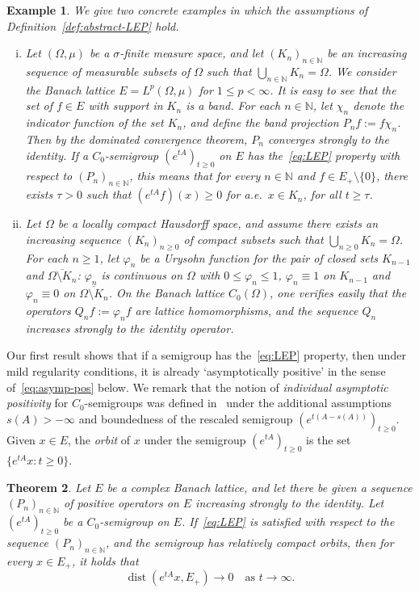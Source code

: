 \documentclass[sn-mathphys]{sn-jnl}%
\theoremstyle{thmstyleone}
\newtheorem{theorem}{Theorem}[section]
\theoremstyle{thmstylethree}
\newtheorem{example}[theorem]{Example}
\DeclareMathOperator{\dist}{dist}
\newcommand{\NN}{\mathbb{N}}
\begin{document}
\begin{example}
	\label{ex:abstract-LEP}
	We give two concrete examples in which the assumptions of Definition~\ref{def:abstract-LEP} hold.
	\begin{enumerate}[(i)]
		\item Let $(\Omega,\mu)$ be a $\sigma$-finite measure space, and let $(K_n)_{n\in\NN}$ be an increasing sequence of measurable subsets of $\Omega$ such that $\bigcup_{n\in\NN}K_n = \Omega$. We consider the Banach lattice $E=L^p(\Omega,\mu)$ for $1\le p<\infty$. It is easy to see that the set of $f\in E$ with support in $K_n$ is a band. For each $n\in\NN$, let $\chi_n$ denote the indicator function of the set $K_n$, and define the band projection $P_n f := f \chi_n$. Then by the dominated convergence theorem, $P_n$ converges strongly to the identity. If a $C_0$-semigroup $(e^{tA})_{t\ge 0}$ on $E$ has the~\eqref{eq:LEP} property with respect to $(P_n)_{n\in\NN}$, this means that for every $n\in\NN$ and $f\in E_+\setminus\{0\}$, there exists $\tau>0$ such that $(e^{tA}f)(x) \ge 0$ for a.e.\ $x\in K_n$, for all $t\ge\tau$.
		
		\item Let $\Omega$ be a locally compact Hausdorff space, and assume there exists an increasing sequence $(K_n)_{n\ge 0}$ of compact subsets such that $\bigcup_{n\ge 0}K_n=\Omega$. For each $n\ge 1$, let $\varphi_n$ be a Urysohn function for the pair of closed sets $K_{n-1}$ and $\overline{\Omega\setminus K_n}$: $\varphi_n$ is continuous on $\Omega$ with $0\le \varphi_n \le 1$, $\varphi_n \equiv 1$ on $K_{n-1}$ and $\varphi_n \equiv 0$ on $\overline{\Omega\setminus K_n}$. On the Banach lattice $C_0(\Omega)$, one verifies easily that the operators $Q_n f :=\varphi_n f$ are lattice homomorphisms, and the sequence $Q_n$ increases strongly to the identity operator.
	\end{enumerate}
\end{example}

Our first result shows that if a semigroup has the~\eqref{eq:LEP} property, then under mild regularity conditions, it is already `asymptotically positive' in the sense of~\eqref{eq:asymp-pos} below. We remark that the notion of \emph{individual asymptotic positivity} for $C_0$-semigroups was defined in~\cite[Definition 8.1]{DGK2} under the additional assumptions $s(A)>-\infty$ and boundedness of the rescaled semigroup $(e^{t(A-s(A))})_{t\ge 0}$. Given $x\in E$, the \emph{orbit} of $x$ under the semigroup $(e^{tA})_{t\ge 0}$ is the set $\{e^{tA}x : t \ge 0\}$.
\begin{theorem}
	\label{thm:asymp-pos}
	Let $E$ be a complex Banach lattice, and let there be given a sequence $(P_n)_{n\in\NN}$ of positive operators on $E$ increasing strongly to the identity. Let $(e^{tA})_{t\ge 0}$ be a $C_0$-semigroup on $E$. If~\eqref{eq:LEP} is satisfied with respect to the sequence $(P_n)_{n\in\NN}$, and the semigroup has relatively compact orbits, then for every $x\in E_+$, it holds that
	\begin{equation}
		\label{eq:asymp-pos}
		\dist(e^{tA}x, E_+) \longrightarrow 0 \quad\text{as } t\to\infty.
	\end{equation}
\end{theorem}
\end{document}
